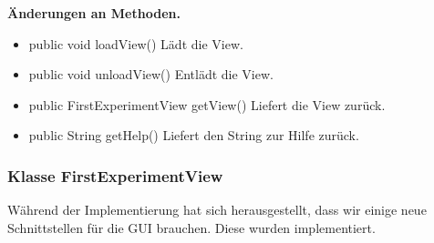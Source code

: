 \documentclass{article}
\begin{document}
    \textbf{Änderungen an Methoden.}
      \begin{itemize}
		\item public void loadView()\newline
              Lädt die View.
        \item public void unloadView()\newline
              Entlädt die View.
        \item public FirstExperimentView getView()\newline
              Liefert die View zurück.
        \item public String getHelp()\newline
              Liefert den String zur Hilfe zurück.
      \end{itemize}
	  
    \subsubsection{Klasse FirstExperimentView}
	Während der Implementierung hat sich herausgestellt, dass wir einige neue Schnittstellen für die GUI brauchen. Diese wurden implementiert.\newline
           
\end{document}
